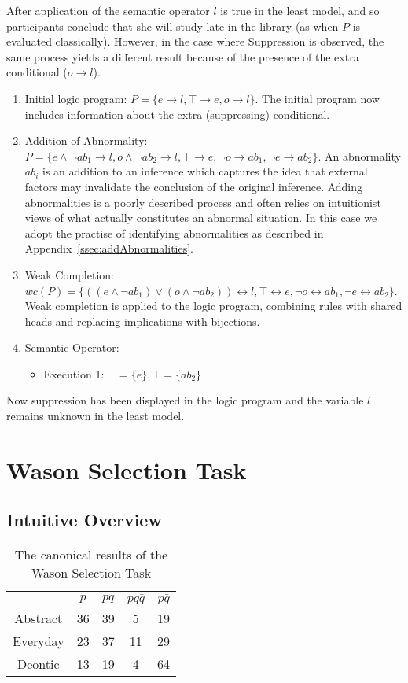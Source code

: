 After application of the semantic operator $l$ is true in the least model, and so participants conclude that she will study late in the library (as when $P$ is evaluated classically). However, in the case where Suppression is observed, the same process yields a different result because of the presence of the extra conditional ($o\rightarrow l$).
\begin{enumerate}
\item Initial logic program: $P = \{e \rightarrow l, \top \rightarrow e, o \rightarrow l \}$. The initial program now includes information about the extra (suppressing) conditional.
\item Addition of Abnormality: $P = \{e \land \lnot ab_1 \rightarrow l, o \land \lnot ab_2 \rightarrow l, \top \rightarrow e, \lnot o \rightarrow ab_1, \lnot e \rightarrow ab_2 \}$. An abnormality $ab_i$ is an addition to an inference which captures the idea that external factors may invalidate the conclusion of the original inference. Adding abnormalities is a poorly described process and often relies on intuitionist views of what actually constitutes an abnormal situation. In this case we adopt the practise of identifying abnormalities as described in Appendix~\ref{ssec:addAbnormalities}.
\item Weak Completion: $wc(P) = \{((e \land \lnot ab_1) \lor (o \land \lnot ab_2)) \leftrightarrow l, \top \leftrightarrow e, \lnot o \leftrightarrow ab_1, \lnot e \leftrightarrow ab_2 \}$. Weak completion is applied to the logic program, combining rules with shared heads and replacing implications with bijections.
\item Semantic Operator:
\begin{itemize}
\item Execution 1: $\top=\{e\}, \bot=\{ab_2\}$
\end{itemize}
\end{enumerate}

Now suppression has been displayed in the logic program and the variable $l$ remains unknown in the least model.

\section{Wason Selection Task}
\subsection{Intuitive Overview} \label{ssec:wst_intuition}
\begin{table}
\begin{center}


\begin{tabular}{ c c c c c}
  & \textbf{$p$} & \textbf{$pq$} & \textbf{$pq\bar{q}$} & \textbf{$p\bar{q}$}\\ 
 Abstract & 36 & 39 & 5 & 19\\  
 Everyday & 23 & 37 & 11 & 29\\  
 Deontic & 13 & 19 & 4 & 64
\end{tabular}
\caption{The canonical results of the Wason Selection Task}
\label{tbl:can}
\end{center}
\end{table}


